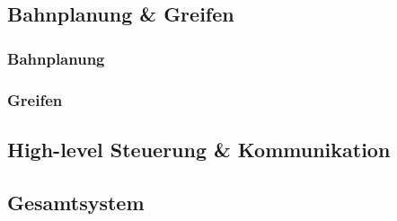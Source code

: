 \documentclass[de,ids]{fziartcl}
\begin{document}
\subsection{Bahnplanung \& Greifen}
\subsubsection{Bahnplanung}
\subsubsection{Greifen}
\subsection{High-level Steuerung \& Kommunikation}
\subsection{Gesamtsystem}


\end{document}
